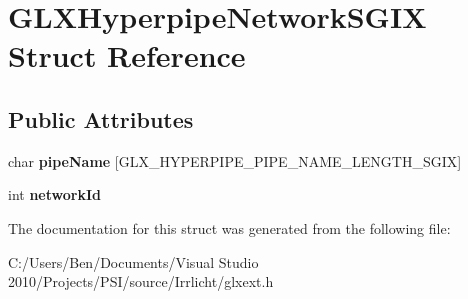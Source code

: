 \hypertarget{struct_g_l_x_hyperpipe_network_s_g_i_x}{\section{G\-L\-X\-Hyperpipe\-Network\-S\-G\-I\-X Struct Reference}
\label{struct_g_l_x_hyperpipe_network_s_g_i_x}
}
\subsection*{Public Attributes}
\begin{DoxyCompactItemize}
\item 
\hypertarget{struct_g_l_x_hyperpipe_network_s_g_i_x_a6338b9717fa895aec16b932f2ef693ed}{char {\bfseries pipe\-Name} \mbox{[}G\-L\-X\-\_\-\-H\-Y\-P\-E\-R\-P\-I\-P\-E\-\_\-\-P\-I\-P\-E\-\_\-\-N\-A\-M\-E\-\_\-\-L\-E\-N\-G\-T\-H\-\_\-\-S\-G\-I\-X\mbox{]}}\label{struct_g_l_x_hyperpipe_network_s_g_i_x_a6338b9717fa895aec16b932f2ef693ed}

\item 
\hypertarget{struct_g_l_x_hyperpipe_network_s_g_i_x_a81393053988b32fadb0b21615024add1}{int {\bfseries network\-Id}}\label{struct_g_l_x_hyperpipe_network_s_g_i_x_a81393053988b32fadb0b21615024add1}

\end{DoxyCompactItemize}


The documentation for this struct was generated from the following file\-:\begin{DoxyCompactItemize}
\item 
C\-:/\-Users/\-Ben/\-Documents/\-Visual Studio 2010/\-Projects/\-P\-S\-I/source/\-Irrlicht/glxext.\-h\end{DoxyCompactItemize}
